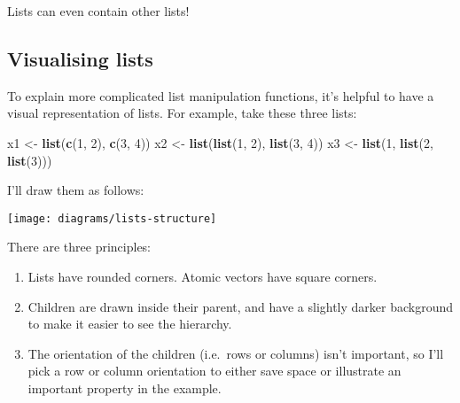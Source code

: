 \documentclass[]{book}
\newenvironment{Shaded}{\begin{snugshade}}{\end{snugshade}}
\newcommand{\KeywordTok}[1]{\textcolor[rgb]{0.13,0.29,0.53}{\textbf{{#1}}}}
\newcommand{\DecValTok}[1]{\textcolor[rgb]{0.00,0.00,0.81}{{#1}}}
\newcommand{\StringTok}[1]{\textcolor[rgb]{0.31,0.60,0.02}{{#1}}}
\newcommand{\CommentTok}[1]{\textcolor[rgb]{0.56,0.35,0.01}{\textit{{#1}}}}
\newcommand{\NormalTok}[1]{{#1}}
\begin{document}
Lists can even contain other lists!

\begin{Shaded}
\end{Shaded}

\subsection{Visualising lists}\label{visualising-lists}

To explain more complicated list manipulation functions, it's helpful to
have a visual representation of lists. For example, take these three
lists:

\begin{Shaded}
\begin{Highlighting}[]
\NormalTok{x1 <-}\StringTok{ }\KeywordTok{list}\NormalTok{(}\KeywordTok{c}\NormalTok{(}\DecValTok{1}\NormalTok{, }\DecValTok{2}\NormalTok{), }\KeywordTok{c}\NormalTok{(}\DecValTok{3}\NormalTok{, }\DecValTok{4}\NormalTok{))}
\NormalTok{x2 <-}\StringTok{ }\KeywordTok{list}\NormalTok{(}\KeywordTok{list}\NormalTok{(}\DecValTok{1}\NormalTok{, }\DecValTok{2}\NormalTok{), }\KeywordTok{list}\NormalTok{(}\DecValTok{3}\NormalTok{, }\DecValTok{4}\NormalTok{))}
\NormalTok{x3 <-}\StringTok{ }\KeywordTok{list}\NormalTok{(}\DecValTok{1}\NormalTok{, }\KeywordTok{list}\NormalTok{(}\DecValTok{2}\NormalTok{, }\KeywordTok{list}\NormalTok{(}\DecValTok{3}\NormalTok{)))}
\end{Highlighting}
\end{Shaded}

I'll draw them as follows:

\begin{center}\texttt{[image: diagrams/lists-structure]} \end{center}

There are three principles:

\begin{enumerate}
\def\labelenumi{\arabic{enumi}.}
\item
  Lists have rounded corners. Atomic vectors have square corners.
\item
  Children are drawn inside their parent, and have a slightly darker
  background to make it easier to see the hierarchy.
\item
  The orientation of the children (i.e.~rows or columns) isn't
  important, so I'll pick a row or column orientation to either save
  space or illustrate an important property in the example.
\end{enumerate}
\end{document}
